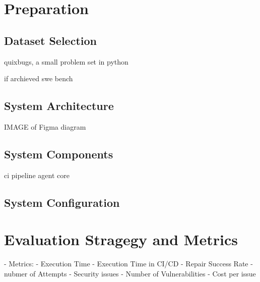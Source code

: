 \section{Preparation}
\subsection{Dataset Selection}
quixbugs, a small problem set in python \cite{linQuixBugsMultilingualProgram2017}

if archieved swe bench \cite{jimenezSWEbenchCanLanguage2024}

\subsection{System Architecture}

IMAGE of Figma diagram

\subsection{System Components}

ci pipeline
agent core

\subsection{System Configuration}

\section{Evaluation Stragegy and Metrics}
- Metrics:
- Execution Time
- Execution Time in CI/CD
- Repair Success Rate
- nubmer of Attempts
- Security issues
- Number of Vulnerabilities
- Cost per issue

